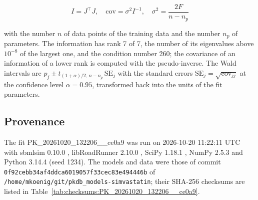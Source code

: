 \begin{equation}
I = J^\top J, \quad \mathrm{cov} = \sigma^2 I^{-1}, \quad \sigma^2 = \frac{2 F}{n - n_p}
\end{equation}

with the number $n$ of data points of the training data and the number $n_p$ of parameters. The information has rank 7 of 7, the number of its eigenvalues above $10^{-8}$ of the largest one, and the condition number 260; the covariance of an information of a lower rank is computed with the pseudo-inverse. The Wald intervals are $\hat{p}_j \pm t_{(1+\alpha)/2,\, n-n_p}\, \mathrm{SE}_j$ with the standard errors $\mathrm{SE}_j = \sqrt{\mathrm{cov}_{jj}}$ at the confidence level $\alpha = 0.95$, transformed back into the units of the fit parameters.

\subsection{Provenance}

The fit PK\_20261020\_132206\_\_ce0a9 was run on 2026-10-20 11:22:11 UTC with sbmlsim 0.10.0 \cite{Koenig2026_sbmlsim}, libRoadRunner 2.10.0 \cite{Welsh2023}, SciPy 1.18.1 \cite{Virtanen2020}, NumPy 2.5.3 \cite{Harris2020} and Python 3.14.4 (seed 1234). The models and data were those of commit \texttt{0f92cebb34af4ddca6019057f33cec83e494446b} of \texttt{/home/mkoenig/git/pkdb\_models-simvastatin}; their SHA-256 checksums are listed in Table~\ref{tab:checksums:PK_20261020_132206__ce0a9}.

